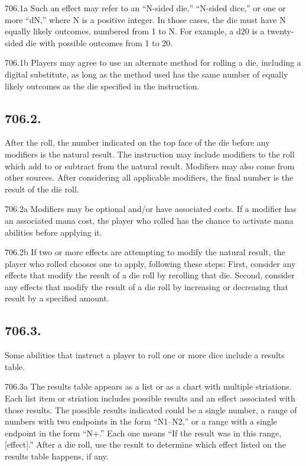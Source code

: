 706.1a Such an effect may refer to an “N-sided die,” “N-sided dice,” or one or more “dN,” where N is a positive integer. In those cases, the die must have N equally likely outcomes, numbered from 1 to N. For example, a d20 is a twenty-sided die with possible outcomes from 1 to 20.

706.1b Players may agree to use an alternate method for rolling a die, including a digital substitute, as long as the method used has the same number of equally likely outcomes as the die specified in the instruction.

\subsection*{706.2.}
After the roll, the number indicated on the top face of the die before any modifiers is the natural result. The instruction may include modifiers to the roll which add to or subtract from the natural result. Modifiers may also come from other sources. After considering all applicable modifiers, the final number is the result of the die roll.

706.2a Modifiers may be optional and/or have associated costs. If a modifier has an associated mana cost, the player who rolled has the chance to activate mana abilities before applying it.

706.2b If two or more effects are attempting to modify the natural result, the player who rolled chooses one to apply, following these steps: First, consider any effects that modify the result of a die roll by rerolling that die. Second, consider any effects that modify the result of a die roll by increasing or decreasing that result by a specified amount.

\subsection*{706.3.}
Some abilities that instruct a player to roll one or more dice include a results table.

706.3a The results table appears as a list or as a chart with multiple striations. Each list item or striation includes possible results and an effect associated with those results. The possible results indicated could be a single number, a range of numbers with two endpoints in the form “N1–N2,” or a range with a single endpoint in the form “N+.” Each one means “If the result was in this range, [effect].” After a die roll, use the result to determine which effect listed on the results table happens, if any.

